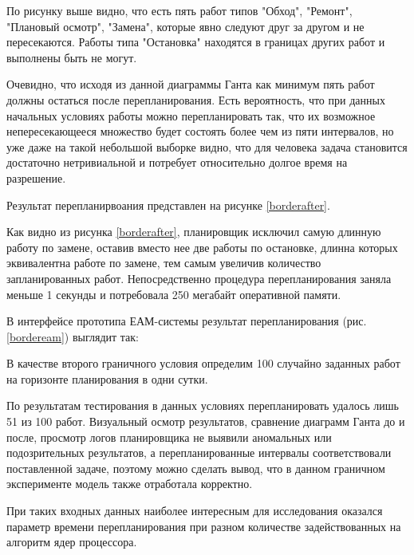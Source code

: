 
По рисунку выше видно, что есть пять работ типов "Обход", "Ремонт", "Плановый осмотр", "Замена", которые явно следуют друг за другом и не пересекаются. Работы типа "Остановка" находятся в границах других работ и выполнены быть не могут.

Очевидно, что исходя из данной диаграммы Ганта как минимум пять работ должны остаться после перепланирования. Есть вероятность, что при данных начальных условиях работы можно перепланировать так, что их возможное непересекающееся множество будет состоять более чем из пяти интервалов, но уже даже на такой небольшой выборке видно, что для человека задача становится достаточно нетривиальной и потребует относительно долгое время на разрешение.

Результат перепланирвоания представлен на рисунке \ref{borderafter}. 


Как видно из рисунка \ref{borderafter}, планировщик исключил самую длинную работу по замене, оставив вместо нее две работы по остановке, длинна которых эквивалентна работе по замене, тем самым увеличив количество запланированных работ. Непосредственно процедура перепланирования заняла меньше 1 секунды и потребовала 250 мегабайт оперативной памяти.

В интерфейсе прототипа ЕАМ-системы результат перепланирования (рис. \ref{bordeream}) выглядит так:
    

В качестве второго граничного условия определим 100 случайно заданных работ на горизонте планирования в одни сутки.

По результатам тестирования в данных условиях перепланировать удалось лишь 51 из 100 работ. Визуальный осмотр результатов, сравнение диаграмм Ганта до и после, просмотр логов планировщика не выявили аномальных или подозрительных результатов, а перепланированные интервалы соответствовали поставленной задаче, поэтому можно сделать вывод, что в данном граничном эксперименте модель также отработала корректно.

При таких входных данных наиболее интересным для исследования оказался параметр времени перепланирования при разном количестве задействованных на алгоритм ядер процессора.

